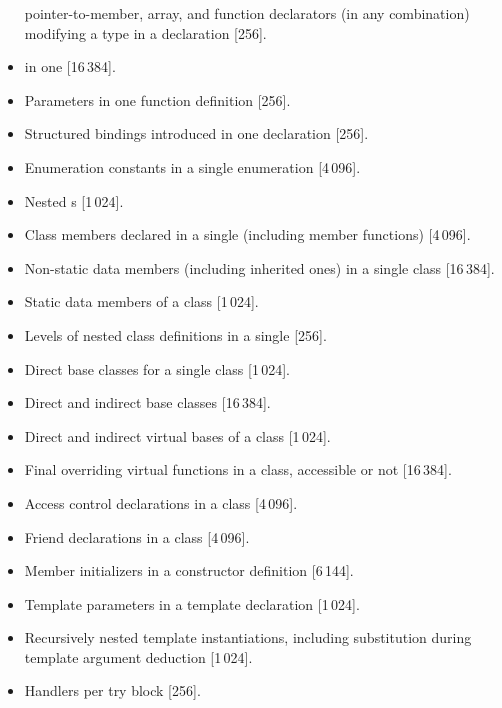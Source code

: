 \begin{itemize}
pointer-to-member,
array, and
function
declarators (in any combination)
modifying a type in a declaration [256].
\item%
 in one  [16\,384].
\item%
Parameters in one function definition [256].
\item%
Structured bindings introduced in one declaration [256].
\item%
Enumeration constants in a single enumeration [4\,096].
\item%
Nested s [1\,024].
\item%
Class members declared in a single 
(including member functions) [4\,096].
\item%
Non-static data members (including inherited ones) in a single class [16\,384].
\item%
Static data members of a class [1\,024].
\item%
Levels of nested class definitions
in a single
[256].
\item%
Direct base classes for a single class [1\,024].
\item%
Direct and indirect base classes [16\,384].
\item%
Direct and indirect virtual bases of a class [1\,024].
\item%
Final overriding virtual functions in a class,
accessible or not [16\,384].
\item%
Access control declarations in a class [4\,096].
\item%
Friend declarations in a class [4\,096].
\item%
Member initializers in a constructor definition [6\,144].
\item%
Template parameters in a template declaration [1\,024].
\item%
Recursively nested template instantiations, including substitution
during template argument deduction [1\,024].
\item%
Handlers per try block [256].

\end{itemize}

